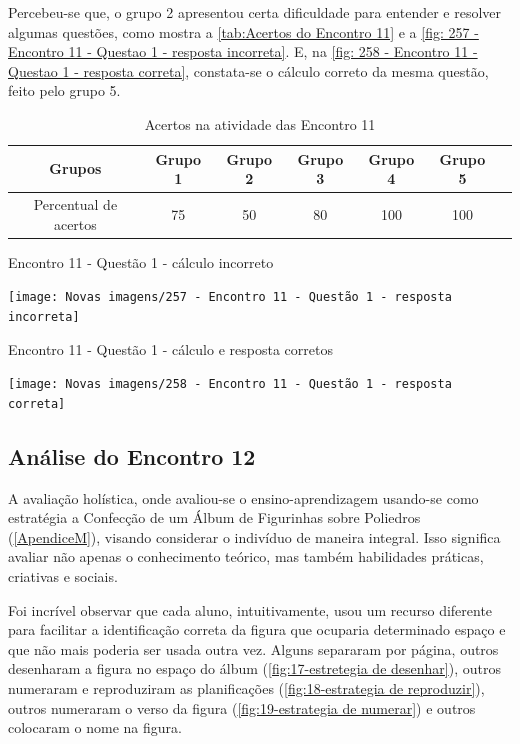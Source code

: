 Percebeu-se que, o grupo 2 apresentou certa dificuldade para entender e resolver algumas questões, como mostra a \autoref{tab:Acertos do Encontro 11} e a \autoref{fig: 257 - Encontro 11 - Questao 1 - resposta incorreta}. E, na \autoref{fig: 258 - Encontro 11 - Questao 1 - resposta correta}, constata-se o cálculo correto da mesma questão, feito pelo grupo 5.

\begin{table}[htbp] \centering
    \caption{Acertos na atividade das Encontro 11} \label{tab:Acertos do Encontro 11}
    \begin{tabular}{|c|c|c|c|c|c|c|}
        \hline
        \textbf{Grupos}       & \textbf{Grupo 1} & \textbf{Grupo 2} & \textbf{Grupo 3} & \textbf{Grupo 4} & \textbf{Grupo 5} \\
        \hline
        Percentual de acertos & 75               & 50               & 80               & 100              & 100              \\
        \hline
    \end{tabular}
    \legend{\legendaTabela}
\end{table}

\begin{CenteredFigure}
    \caption{Encontro 11 - Questão 1 - cálculo incorreto} \label{fig: 257 - Encontro 11 - Questao 1 - resposta incorreta}
    \texttt{[image: Novas imagens/257 - Encontro 11 - Questão 1 - resposta incorreta]}
    \legend{\autoria}
\end{CenteredFigure}

\begin{CenteredFigure}
    \caption{Encontro 11 - Questão 1 - cálculo e resposta corretos} \label{fig: 258 - Encontro 11 - Questao 1 - resposta correta}
    \texttt{[image: Novas imagens/258 - Encontro 11 - Questão 1 - resposta correta]}
    \legend{\autoria}
\end{CenteredFigure}

\subsection{Análise do Encontro 12}

A avaliação holística, onde avaliou-se o ensino-aprendizagem usando-se como estratégia a Confecção de um Álbum de Figurinhas sobre Poliedros (\autoref{ApendiceM}), visando considerar o indivíduo de maneira integral. Isso significa avaliar não apenas o conhecimento teórico, mas também habilidades práticas, criativas e sociais.

Foi incrível observar que cada aluno, intuitivamente, usou um recurso diferente para facilitar a identificação correta da figura que ocuparia determinado espaço e que não mais poderia ser usada outra vez. Alguns separaram por página, outros desenharam a figura no espaço do álbum (\autoref{fig:17-estretegia de desenhar}), outros numeraram e reproduziram as planificações (\autoref{fig:18-estrategia de reproduzir}), outros numeraram o verso da figura (\autoref{fig:19-estrategia de numerar}) e outros colocaram o nome na figura.

